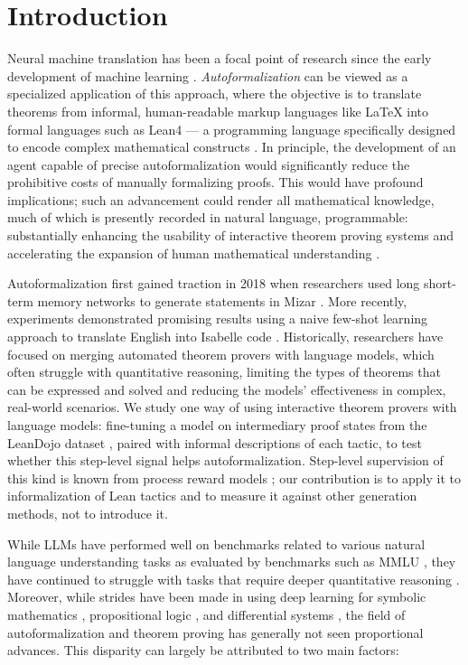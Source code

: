 \documentclass{article} %
\begin{document}
\section{Introduction}
\noindent Neural machine translation has been a focal point of research since the early development of machine learning \citep{nmt2015baidu} \citep{nmt2016google}. \textit{Autoformalization} can be viewed as a specialized application of this approach, where the objective is to translate theorems from informal, human-readable markup languages like LaTeX into formal languages such as Lean4 --- a programming language specifically designed to encode complex mathematical constructs \citep{lean4}. In principle, the development of an agent capable of precise autoformalization would significantly reduce the prohibitive costs of manually formalizing proofs. This would have profound implications; such an advancement could render all mathematical knowledge, much of which is presently recorded in natural language, programmable: substantially enhancing the usability of interactive theorem proving systems and accelerating the expansion of human mathematical understanding \citep{klein2009formalization}.

Autoformalization first gained traction in 2018 when researchers used long short-term memory networks to generate statements in Mizar \citep{WangNMT}. More recently, experiments demonstrated promising results using a naive few-shot learning approach to translate English into Isabelle code \citep{autoformalization}.
Historically, researchers have focused on merging automated theorem provers with language models, which often struggle with quantitative reasoning, limiting the types of theorems that can be expressed and solved and reducing the models' effectiveness in complex, real-world scenarios. We study one way of using interactive theorem provers with language models: fine-tuning a model on intermediary proof states from the LeanDojo dataset \citep{Leandojo}, paired with informal descriptions of each tactic, to test whether this step-level signal helps autoformalization. Step-level supervision of this kind is known from process reward models \citep{lightman2023lets,uesato2022solving}; our contribution is to apply it to informalization of Lean tactics and to measure it against other generation methods, not to introduce it.




While LLMs have performed well on benchmarks related to various natural language understanding tasks as evaluated by benchmarks such as MMLU \citep{MMLU}, they have continued to struggle with tasks that require deeper quantitative reasoning \citep{solvingQR}. Moreover, while strides have been made in using deep learning for symbolic mathematics \citep{DeepLearningSymbolic}, propositional logic \citep{TeachingLogics}, and differential systems \citep{LearningAMC}, the field of autoformalization and theorem proving has generally not seen proportional advances. This disparity can largely be attributed to two main factors:
\end{document}
